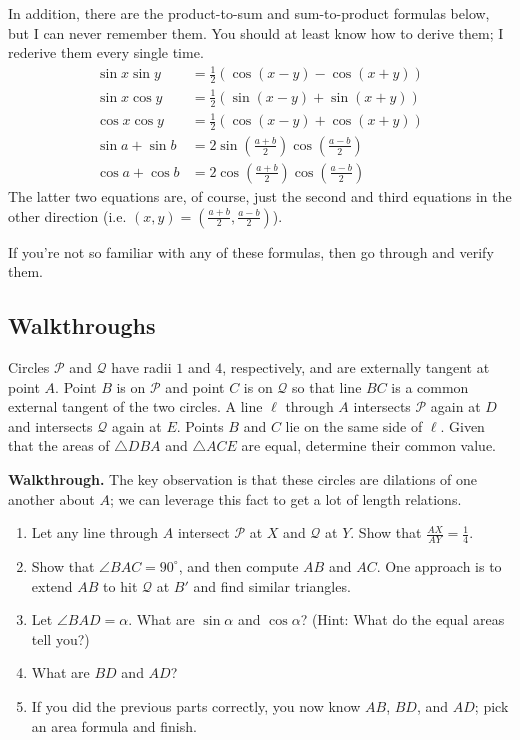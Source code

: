 \documentclass{scrartcl}
\providecommand{\half}{\frac{1}{2}}
\providecommand{\dg}{^\circ}
\providecommand{\ii}{\item}
\newenvironment{walkthrough}{\noindent\textbf{Walkthrough.}}{}
\begin{document}
In addition, there are the product-to-sum and sum-to-product formulas below,
but I can never remember them. You should at least know how to derive them;
I rederive them every single time.
\begin{align*}
	\sin x\sin y &= \half(\cos(x - y) - \cos(x + y))\\
	\sin x\cos y &= \half(\sin(x - y) + \sin(x + y))\\
	\cos x\cos y &= \half(\cos(x - y) + \cos(x + y))\\
	\sin a + \sin b &= 2\sin\left(\frac{a + b}2\right)
	\cos\left(\frac{a - b}2\right)\\
	\cos a + \cos b &= 2\cos\left(\frac{a + b}2\right)
	\cos\left(\frac{a - b}2\right)
\end{align*}
The latter two equations are, of course, just the second and third equations
in the other direction
(i.e. $(x, y) = \left(\frac{a + b}{2}, \frac{a - b}{2}\right)$).

If you're not so familiar with any of these formulas,
then go through and verify them.

\pagebreak
\subsection{Walkthroughs}
\begin{example}[2015 AIME II/15]
	Circles $\mathcal{P}$ and $\mathcal{Q}$ have radii $1$ and $4$,
	respectively, and are externally tangent at point $A$.
	Point $B$ is on $\mathcal{P}$ and point $C$ is on $\mathcal{Q}$ so that
	line $BC$ is a common external tangent of the two circles.
	A line $\ell$ through $A$ intersects $\mathcal{P}$ again at $D$ and
	intersects $\mathcal{Q}$ again at $E$.
	Points $B$ and $C$ lie on the same side of $\ell$.
	Given that the areas of $\triangle DBA$ and $\triangle ACE$ are equal,
	determine their common value.
\end{example}
\begin{walkthrough}
	The key observation is that these circles are dilations of one another
	about $A$; we can leverage this fact to get a lot of length relations.
	\begin{enumerate}[label=\textbf{(\alph*)}]
		\ii Let any line through $A$ intersect $\mathcal P$ at $X$
		and $\mathcal Q$ at $Y$. Show that $\frac{AX}{AY} = \frac14$.
		\ii Show that $\angle BAC = 90\dg$, and then compute $AB$ and $AC$.
		One approach is to extend $AB$ to hit $\mathcal Q$ at $B'$
		and find similar triangles.
		\ii Let $\angle BAD = \alpha$. What are $\sin\alpha$ and $\cos\alpha$?
		(Hint: What do the equal areas tell you?)
		\ii What are $BD$ and $AD$?
		\ii If you did the previous parts correctly, you now know
		$AB$, $BD$, and $AD$; pick an area formula and finish.
	\end{enumerate}
\end{walkthrough}
\end{document}
